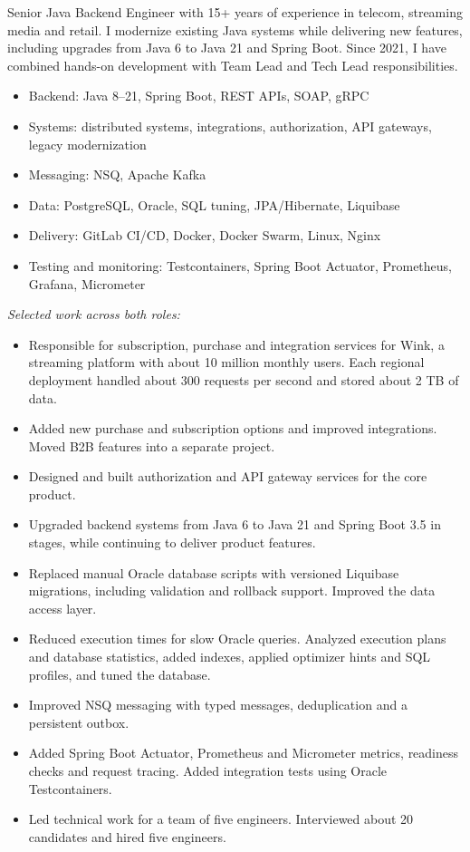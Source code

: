 Senior Java Backend Engineer with 15+ years of experience in telecom, streaming media
and retail. I modernize existing Java systems while delivering new features,
including upgrades from Java 6 to Java 21 and Spring Boot. Since 2021, I have combined
hands-on development with Team Lead and Tech Lead responsibilities.

\begin{itemize}[leftmargin=1.3em, itemsep=0.2em]
  \item Backend: Java 8--21, Spring Boot, REST APIs, SOAP, gRPC
  \item Systems: distributed systems, integrations, authorization, API gateways, legacy modernization
  \item Messaging: NSQ, Apache Kafka
  \item Data: PostgreSQL, Oracle, SQL tuning, JPA/Hibernate, Liquibase
  \item Delivery: GitLab CI/CD, Docker, Docker Swarm, Linux, Nginx
  \item Testing and monitoring: Testcontainers, Spring Boot Actuator, Prometheus, Grafana, Micrometer
\end{itemize}

\textit{Selected work across both roles:}
\begin{itemize}[leftmargin=1.3em, itemsep=0.2em]
  \item Responsible for subscription, purchase and integration services for Wink, a streaming platform with about 10 million monthly users. Each regional deployment handled about 300 requests per second and stored about 2 TB of data.
  \item Added new purchase and subscription options and improved integrations. Moved B2B features into a separate project.
  \item Designed and built authorization and API gateway services for the core product.
  \item Upgraded backend systems from Java 6 to Java 21 and Spring Boot 3.5 in stages, while continuing to deliver product features.
  \item Replaced manual Oracle database scripts with versioned Liquibase migrations, including validation and rollback support. Improved the data access layer.
  \item Reduced execution times for slow Oracle queries. Analyzed execution plans and database statistics, added indexes, applied optimizer hints and SQL profiles, and tuned the database.
  \item Improved NSQ messaging with typed messages, deduplication and a persistent outbox.
  \item Added Spring Boot Actuator, Prometheus and Micrometer metrics, readiness checks and request tracing. Added integration tests using Oracle Testcontainers.
  \item Led technical work for a team of five engineers. Interviewed about 20 candidates and hired five engineers.
\end{itemize}

